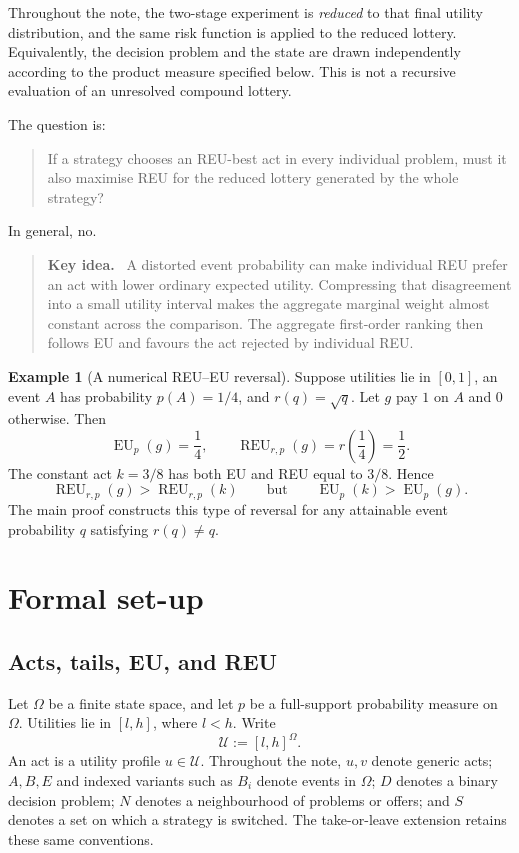 \documentclass[11pt,a4paper]{article}
\theoremstyle{definition}
\newtheorem{example}[example]{Example}
\newcommand{\REU}{\operatorname{REU}}
\newcommand{\EU}{\operatorname{EU}}
\newcommand{\U}{\mathcal U}
\newenvironment{keyidea}
  {\begin{quote}\color{MidnightBlue}\textbf{Key idea.}\ }
  {\end{quote}}
\begin{document}
Throughout the note, the two-stage experiment is \emph{reduced} to that final
utility distribution, and the same risk function is applied to the reduced
lottery. Equivalently, the decision problem and the state are drawn
independently according to the product measure specified below. This is not a
recursive evaluation of an unresolved compound lottery.

The question is:

\begin{quote}
If a strategy chooses an REU-best act in every individual problem, must it
also maximise REU for the reduced lottery generated by the whole strategy?
\end{quote}

In general, no.

\begin{keyidea}
A distorted event probability can make individual REU prefer an act with
lower ordinary expected utility. Compressing that disagreement into a small
utility interval makes the aggregate marginal weight almost constant across
the comparison. The aggregate first-order ranking then follows EU and favours
the act rejected by individual REU.
\end{keyidea}

\begin{example}[A numerical REU--EU reversal]\label{ex:numerical}
Suppose utilities lie in $[0,1]$, an event $A$ has probability $p(A)=1/4$,
and $r(q)=\sqrt q$. Let $g$ pay $1$ on $A$ and $0$ otherwise. Then
\[
 \EU_p(g)=\frac14,
 \qquad
 \REU_{r,p}(g)=r\!\left(\frac14\right)=\frac12.
\]
The constant act $k=3/8$ has both EU and REU equal to $3/8$. Hence
\[
 \REU_{r,p}(g)>\REU_{r,p}(k)
 \qquad\text{but}\qquad
 \EU_p(k)>\EU_p(g).
\]
The main proof constructs this type of reversal for any attainable event
probability $q$ satisfying $r(q)\neq q$.
\end{example}

\section{Formal set-up}

\subsection{Acts, tails, EU, and REU}

Let $\Omega$ be a finite state space, and let $p$ be a full-support
probability measure on $\Omega$. Utilities lie in $[l,h]$, where $l<h$. Write
\[
 \U:=[l,h]^\Omega.
\]
An act is a utility profile $u\in\U$. Throughout the note, $u,v$ denote
generic acts; $A,B,E$ and indexed variants such as $B_i$ denote events in
$\Omega$; $D$ denotes a binary decision problem; $N$ denotes a neighbourhood
of problems or offers; and $S$ denotes a set on which a strategy is switched.
The take-or-leave extension retains these same conventions.
\end{document}
